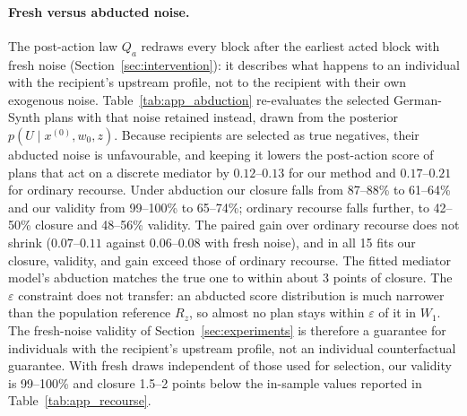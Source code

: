 \paragraph{Fresh versus abducted noise.}
The post-action law $Q_a$ redraws every block after the earliest acted block
with fresh noise (Section~\ref{sec:intervention}): it describes what happens
to an individual with the recipient's upstream profile, not to the recipient
with their own exogenous noise. Table~\ref{tab:app_abduction} re-evaluates the
selected German-Synth plans with that noise retained instead, drawn from the
posterior $p(U\mid x^{(0)},w_0,z)$. Because recipients are selected as true
negatives, their abducted noise is unfavourable, and keeping it lowers the
post-action score of plans that act on a discrete mediator by $0.12$--$0.13$
for our method and $0.17$--$0.21$ for ordinary recourse. Under abduction our
closure falls from 87--88\% to 61--64\% and our validity from 99--100\% to
65--74\%; ordinary recourse falls further, to 42--50\% closure and 48--56\%
validity. The paired gain over ordinary recourse does not shrink ($0.07$--$0.11$
against $0.06$--$0.08$ with fresh noise), and in all 15 fits our closure,
validity, and gain exceed those of ordinary recourse. The fitted mediator
model's abduction matches the true one to within about 3 points of closure. The
$\varepsilon$ constraint does not transfer: an abducted score distribution is
much narrower than the population reference $R_z$, so almost no plan stays
within $\varepsilon$ of it in $W_1$. The fresh-noise validity of
Section~\ref{sec:experiments} is therefore a guarantee for individuals with
the recipient's upstream profile, not an individual counterfactual guarantee.
With fresh draws independent of those used for selection, our validity is
99--100\% and closure 1.5--2 points below the in-sample values reported in
Table~\ref{tab:app_recourse}.

